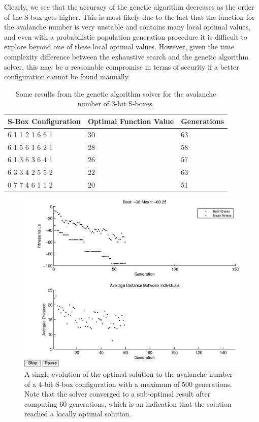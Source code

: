 \documentclass[11pt]{article}
\begin{document}
Clearly, we see that the accuracy of the genetic algorithm decreases as the order of the S-box gets higher. This is most likely due to the fact that the function for the avalanche number is very unstable and contains many local optimal values, and even with a probabilistic population generation procedure it is difficult to explore beyond one of these local optimal values. However, given the time complexity difference between the exhaustive search and the genetic algorithm solver, this may be a reasonable compromise in terms of security if a better configuration cannot be found manually. 

\begin{table}
	\centering
	\label{avTable}
	\caption{Some results from the genetic algorithm solver for the avalanche number of $3$-bit S-boxes.}
    \begin{tabular}{|l|l|l|}
        \hline
        S-Box Configuration & Optimal Function Value & Generations \\ \hline
        6     1     1     2     1     6     6     1 & 30 & 63 \\
        6     1     5     6     1     6     2     1 & 28 & 58 \\ 
        6     1     3     6     3     6     4     1 & 26 & 57 \\ 
	6     3     3     4     2     5     5     2 & 22 & 63 \\ 
        0     7     7     4     6     1     1     2 & 20 & 51 \\ 
        \hline
    \end{tabular}
\end{table}

\begin{figure}[!ht]
\centering
	\includegraphics[scale=0.5]{images/avalanche_results16.eps} 

	\caption{A single evolution of the optimal solution to the avalanche number of a $4$-bit S-box configuration with a maximum of $500$ generations. Note that the solver converged to a sub-optimal result after computing $60$ generations, which is an indication that the solution reached a locally optimal solution.}
	\label{av16}
\end{figure}
\end{document}
